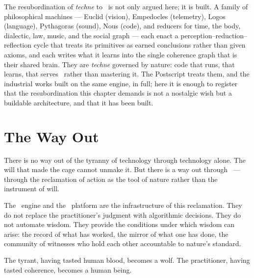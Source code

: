 The resubordination of \emph{techne} to \physis\ is not only argued here; it is
built. A family of philosophical machines --- Euclid (vision), Empedocles
(telemetry), Logos (language), Pythagoras (sound), Nous (code), and reducers for
time, the body, dialectic, law, music, and the social graph --- each enact a
perception--reduction--reflection cycle that treats its primitives as earned
conclusions rather than given axioms, and each writes what it learns into the
single coherence graph that is their shared brain. They are \emph{techne} governed
by nature: code that runs, that learns, that serves \physis\ rather than mastering
it. The Postscript treats them, and the industrial works built on the same engine,
in full; here it is enough to register that the resubordination this chapter
demands is not a nostalgic wish but a buildable architecture, and that it has been
built.

\section{The Way Out}

There is no way out of the tyranny of technology through technology alone. The
will that made the cage cannot unmake it. But there is a way out through
\praxis\ --- through the reclamation of action as the tool of nature rather
than the instrument of will.

The \physis\ engine and the \praxis\ platform are the infrastructure of this
reclamation. They do not replace the practitioner's judgment with algorithmic
decisions. They do not automate wisdom. They provide the conditions under which
wisdom can arise: the record of what has worked, the mirror of what one has
done, the community of witnesses who hold each other accountable to nature's
standard.

The tyrant, having tasted human blood, becomes a wolf. The practitioner, having
tasted coherence, becomes a human being.
